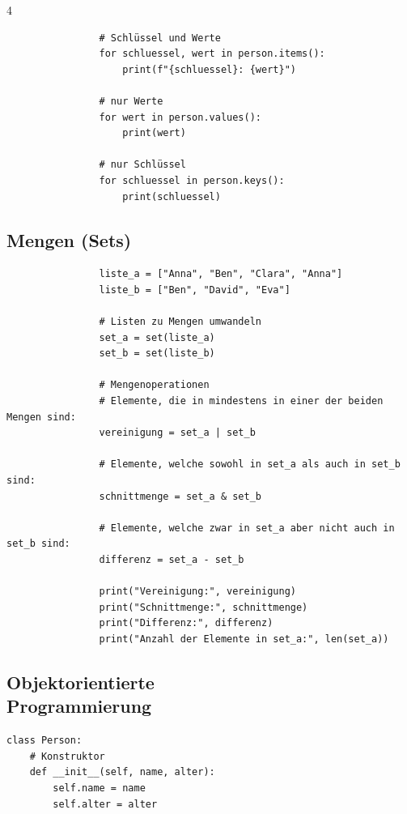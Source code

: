 \begin{landscape}
\begin{multicols*}{4}
\begin{cheatSheetBox}[title=Dictionary durchlaufen]
\begin{lstlisting}
				# Schlüssel und Werte
				for schluessel, wert in person.items():
					print(f"{schluessel}: {wert}")

				# nur Werte
				for wert in person.values():
					print(wert)

				# nur Schlüssel
				for schluessel in person.keys():
					print(schluessel)
			\end{lstlisting}
		\end{cheatSheetBox}

		\columnbreak\textcolor{\cheatSheetColor}{\subsection*{Mengen (Sets)}}
		\begin{cheatSheetBox}[title=Mengen (Sets)]
			\begin{lstlisting}
				liste_a = ["Anna", "Ben", "Clara", "Anna"]
				liste_b = ["Ben", "David", "Eva"]

				# Listen zu Mengen umwandeln
				set_a = set(liste_a)
				set_b = set(liste_b)

				# Mengenoperationen
				# Elemente, die in mindestens in einer der beiden Mengen sind:
				vereinigung = set_a | set_b

				# Elemente, welche sowohl in set_a als auch in set_b sind:
				schnittmenge = set_a & set_b

				# Elemente, welche zwar in set_a aber nicht auch in set_b sind:
				differenz = set_a - set_b

				print("Vereinigung:", vereinigung)
				print("Schnittmenge:", schnittmenge)
				print("Differenz:", differenz)
				print("Anzahl der Elemente in set_a:", len(set_a))
			\end{lstlisting}
		\end{cheatSheetBox}

		\columnbreak\textcolor{\cheatSheetColor}{\subsection*{Objektorientierte\\ Programmierung}}

		\begin{cheatSheetBox}[title=Klassen definieren]
			\begin{lstlisting}
class Person:
    # Konstruktor
    def __init__(self, name, alter):
        self.name = name
        self.alter = alter
    

\end{lstlisting}
\end{cheatSheetBox}
\end{multicols*}
\end{landscape}
